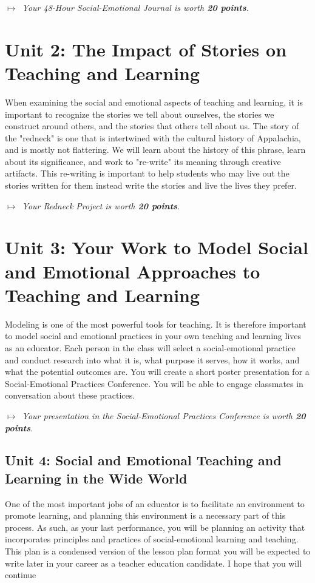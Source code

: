 \documentclass{tufte-handout}
\begin{document}
\medskip\noindent\textit{$\mapsto$~Your 48-Hour Social-Emotional Journal is worth \textbf{20 points}.}

\section{Unit 2: The Impact of Stories on Teaching and Learning}

When examining the social and emotional aspects of teaching and learning, it is important to recognize the stories we tell about ourselves, the stories we construct around others, and the stories that others tell about us. The story of the "redneck" is one that is intertwined with the cultural history of Appalachia, and is mostly not flattering. We will learn about the history of this phrase, learn about its significance, and work to "re-write" its meaning through creative artifacts. This re-writing is important to help students who may live out the stories written for them instead write the stories and live the lives they prefer.

\medskip\noindent\textit{$\mapsto$~Your Redneck Project is worth \textbf{20 points}.}

\section{Unit 3: Your Work to Model Social and Emotional Approaches to Teaching and Learning}

Modeling is one of the most powerful tools for teaching. It is therefore important to model social and emotional practices in your own teaching and learning lives as an educator. Each person in the class will select a social-emotional practice and conduct research into what it is, what purpose it serves, how it works, and what the potential outcomes are. You will create a short poster presentation for a Social-Emotional Practices Conference. You will be able to engage classmates in conversation about these practices.

\medskip\noindent\textit{$\mapsto$~Your presentation in the Social-Emotional Practices Conference is worth \textbf{20 points}.}

\subsection{Unit 4: Social and Emotional Teaching and Learning in the Wide World}

One of the most important jobs of an educator is to facilitate an environment to promote learning, and planning this environment is a necessary part of this process. As such, as your last performance, you will be planning an activity that incorporates principles and practices of social-emotional learning and teaching. This plan is a condensed version of the lesson plan format you will be expected to write later in your career as a teacher education candidate. I hope that you will continue
\end{document}
